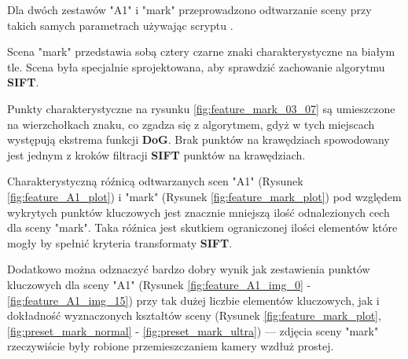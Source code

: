    Dla dwóch zestawów "A1" i "mark" przeprowadzono odtwarzanie sceny przy takich samych parametrach używając scryptu .

   Scena "mark" przedstawia sobą cztery czarne znaki charakterystyczne na białym tle.
   Scena była specjalnie sprojektowana, aby sprawdzić zachowanie algorytmu \textbf{SIFT}.

   Punkty charakterystyczne na rysunku \ref{fig:feature_mark_03_07} są umieszczone na wierzchołkach znaku, co zgadza się z algorytmem, gdyż w tych miejscach występują ekstrema funkcji \textbf{DoG}.
   Brak punktów na krawędziach spowodowany jest jednym z kroków filtracji \textbf{SIFT} punktów na krawędziach.

   Charakterystyczną róźnicą odtwarzanych scen "A1" (Rysunek \ref{fig:feature_A1_plot}) i "mark" (Rysunek \ref{fig:feature_mark_plot}) pod względem wykrytych punktów kluczowych jest znacznie mniejszą ilość odnalezionych cech dla sceny "mark".
   Taka róźnica jest skutkiem ograniczonej ilości elementów które mogły by spełnić kryteria transformaty \textbf{SIFT}.

   Dodatkowo można odznaczyć bardzo dobry wynik jak zestawienia punktów kluczowych dla sceny "A1" (Rysunek \ref{fig:feature_A1_img_0} - \ref{fig:feature_A1_img_15}) przy tak dużej liczbie elementów kluczowych, jak i dokładność wyznaczonych kształtów sceny (Rysunek \ref{fig:feature_mark_plot}, \ref{fig:preset_mark_normal} - \ref{fig:preset_mark_ultra}) --- zdjęcia sceny "mark" rzeczywiście były robione przemieszczaniem kamery wzdłuż prostej.

